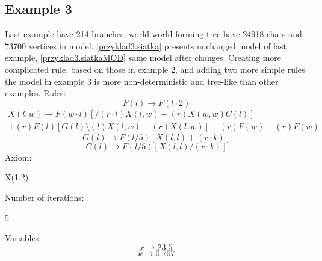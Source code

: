 \documentclass[b5paper,twoside,11pt]{article}
\begin{document}
\subsection*{Example 3}
Last example have 214 branches, world world forming tree have 24918 chars and 73700 vertices in model. 
\figurename \ref{przyklad3.siatka} presents unchanged model of last example, \figurename \ref{przyklad3.siatkaMOD} same model after changes. Creating more complicated rule, based on those in example 2, and adding two more simple rules the model in example 3 is more non-deterministic and tree-like than other examples.
Rules: \newline
\begin{equation*}
F(l)\rightarrow F(l\cdot2) 
\end{equation*}
\begin{multline*}
X(l,w) \rightarrow F(w\cdot l)[/(r\cdot l)X(l,w)-(r)X(w,w)C(l)]\\
+(r)F(l)[G(l)\setminus(l)X(l,w)+(r)X(l,w)]-(r)F(w)-(r)F(w)
\end{multline*}
\begin{equation*}
G(l) \rightarrow F(l/5)[X(l,l)+(r\cdot k)]
\end{equation*}
\begin{equation*}
C(l) \rightarrow F(l/5)[X(l,l)/(r\cdot k)]
\end{equation*}
Axiom:
\begin{center}
X(1,2)
\end{center}
Number of iterations:
\begin{center}
5
\end{center}
Variables:
\begin{equation*}
r\rightarrow 23.5
\end{equation*}
\begin{equation*}
k\rightarrow 0.707
\end{equation*}
\end{document}
